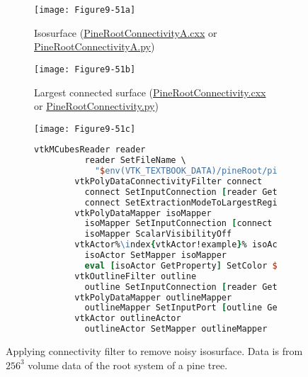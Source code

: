 \begin{figure}[htb]
    \centering
	\begin{subfigure}[h]{0.38\linewidth}
		\texttt{[image: Figure9-51a]}
		\captionsetup{justification=centering}
		\caption{Isosurface (\href{https://lorensen.github.io/VTKExamples/site/Cxx/VisualizationAlgorithms/PineRootConnectivityA/}{PineRootConnectivityA.cxx} or \href{https://lorensen.github.io/VTKExamples/site/Python/VisualizationAlgorithms/PineRootConnectivityA/}{PineRootConnectivityA.py})}
		\label{fig:Figure9-51a}
	\end{subfigure}
	\hfill
	\begin{subfigure}[h]{0.38\linewidth}
		\texttt{[image: Figure9-51b]}
		\captionsetup{justification=centering}
		\caption{Largest connected surface (\href{https://lorensen.github.io/VTKExamples/site/Cxx/VisualizationAlgorithms/PineRootConnectivity/}{PineRootConnectivity.cxx} or \href{https://lorensen.github.io/VTKExamples/site/Python/VisualizationAlgorithms/PineRootConnectivity/}{PineRootConnectivity.py})}
        \label{fig:Figure9-51b}
	\end{subfigure}
	\hfill
	\begin{subfigure}[h]{0.76\linewidth}
		\texttt{[image: Figure9-51c]}
		\captionsetup{justification=centering}
		\caption*{}
        \label{fig:Figure9-51c}
	\end{subfigure}
	\begin{subfigure}[h]{0.76\linewidth}
        \begin{lstlisting}[language=TCL,  caption={}, numbers=none, frame=none, escapechar=\%]
        vtkMCubesReader reader
          reader SetFileName \
            "$env(VTK_TEXTBOOK_DATA)/pineRoot/pine_root.tri"
        vtkPolyDataConnectivityFilter connect
          connect SetInputConnection [reader GetOutputPort]
          connect SetExtractionModeToLargestRegion
        vtkPolyDataMapper isoMapper
          isoMapper SetInputConnection [connect GetOutputPort]
          isoMapper ScalarVisibilityOff
        vtkActor%\index{vtkActor!example}% isoActor
          isoActor SetMapper isoMapper
          eval [isoActor GetProperty] SetColor $raw_sienna
        vtkOutlineFilter outline
          outline SetInputConnection [reader GetOutputPort]
        vtkPolyDataMapper outlineMapper
          outlineMapper SetInputPort [outline GetOutputPort]
        vtkActor outlineActor
          outlineActor SetMapper outlineMapper
        \end{lstlisting}
        \label{fig:Figure9-51d}
	\end{subfigure}
	\caption{Applying connectivity filter to remove noisy isosurface. Data is from $256^3$ volume data of the root system of a pine tree.}\label{fig:Figure9-51}
\end{figure}

